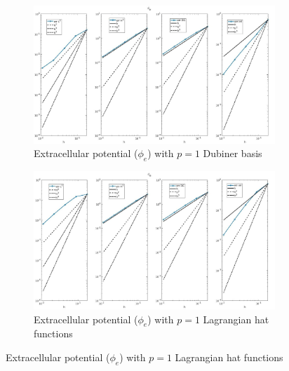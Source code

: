 \documentclass[a4paper,11pt]{article}
\begin{document}
\begin{figure}[H]
\caption{Comparison of the extracellular potential ($\phi_e$)}
\label{phie_1}
\begin{subfigure}{\textwidth}
\begin{center}
\includegraphics[width = \textwidth]{./errors/D1_Phie_1.jpg}
\caption{Extracellular potential ($\phi_e$) with $p=1$ Dubiner basis}
\end{center}
\end{subfigure}
\begin{subfigure}{\textwidth}
\begin{center}
\includegraphics[width =\textwidth]{./errors/P1_Phie_1.jpg}
\caption{Extracellular potential ($\phi_e$) with $p=1$ Lagrangian hat functions}
\end{center}
\end{subfigure}
\end{figure}
\newpage
\end{document}
